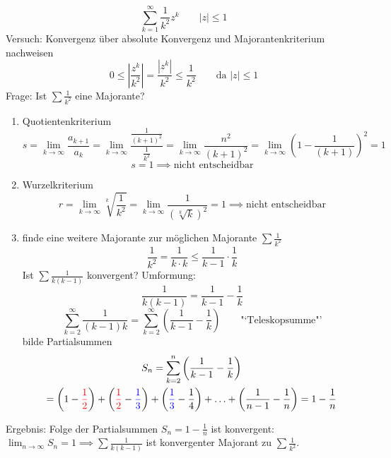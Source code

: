 \begin{example}
	\[
		\sum_{k=1}^\infty \frac{1}{k^2}z^k \qquad |z|\leq1
	\]
	Versuch: Konvergenz über absolute Konvergenz und Majorantenkriterium nachweisen
	\[
		0 \leq \left|\frac{z^k}{k^2}\right|=\frac{|z^k|}{k^2}\leq\frac{1}{k^2}\qquad \text{da } |z|\leq1
	\]
	Frage: Ist \( \sum\frac{1}{k^2} \) eine Majorante?
	
	\begin{enumerate}
		\item Quotientenkriterium 
		\[
		   s=\lim_{k\rightarrow\infty}\frac{a_{k+1}}{a_k}
			=\lim_{k\rightarrow\infty}\frac{\frac{1}{(k+1)^2}}{\frac{1}{k^2}}
			=\lim_{k\rightarrow\infty}\frac{n^2}{(k+1)^2}
			=\lim_{k\rightarrow\infty}\left(1-\frac{1}{(k+1)}\right)^2 
			= 1 
		\]
		\[
			s = 1 \implies \text{nicht entscheidbar} 
		\]
		\item Wurzelkriterium
		\[
		   r=\lim_{k\rightarrow\infty}\sqrt[k]{\frac{1}{k^2}}
			=\lim_{k\rightarrow\infty}\frac{1}{(\sqrt[k]{k})^2}
			= 1 \implies  \text{nicht entscheidbar}
		\]
		\item finde eine weitere Majorante zur möglichen Majorante \( \sum\frac{1}{k^2} \)
		\[
			\frac{1}{k^2}= \frac{1}{k\cdot k}\leq \frac{1}{k-1}\cdot\frac{1}{k}
		\]
		Ist \( \sum\frac{1}{k(k-1)} \) konvergent? Umformung:
		\[
			\frac{1}{k(k-1)}=\frac{1}{k-1}-\frac{1}{k}
		\]
		\[
			\sum_{k=2}^\infty\frac{1}{(k-1)k}=\sum_{k=2}^\infty\left(\frac{1}{k-1}-\frac{1}{k}\right) \qquad \text{"`Teleskopsumme"'}
		\]
		bilde Partialsummen
		\begin{multline*}
			S_n=\sum_{k=2}^n\left(\frac{1}{k-1}-\frac{1}{k}\right)\\=\left(1-{\color{red}\frac{1}{2}}\right)+\left({\color{red}\frac{1}{2}}-{\color{blue}\frac{1}{3}}\right)+\left({\color{blue}\frac{1}{3}}-\frac{1}{4}\right)+\ldots+\left(\frac{1}{n-1}-\frac{1}{n}\right)=1-\frac{1}{n}
		\end{multline*}
	\end{enumerate}
	Ergebnis: Folge der Partialsummen \( S_n = 1- \frac{1}{n}\) ist konvergent: \( \lim_{n\rightarrow\infty} S_n=1 \implies \sum\frac{1}{k(k-1)} \) ist konvergenter Majorant zu \( \sum\frac{1}{k^2} \).
\end{example}




